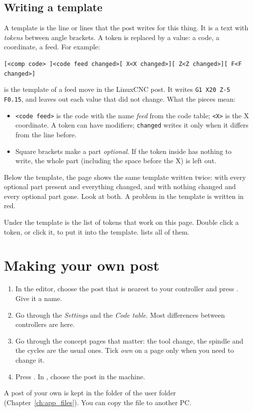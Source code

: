 \subsection{Writing a template}
A template is the line or lines that the post writes for this thing. It is a text with \emph{tokens} between angle brackets. A token is replaced by a value: a code, a coordinate, a feed. For example:
\begin{center}\texttt{[<comp code> ]<code feed changed>[ X<X changed>][ Z<Z changed>][ F<F changed>]}\end{center}
is the template of a feed move in the LinuxCNC post. It writes \texttt{G1 X20 Z-5 F0.15}, and leaves out each value that did not change. What the pieces mean:
\begin{itemize}
  \item \texttt{<code feed>} is the code with the name \emph{feed} from the code table; \texttt{<X>} is the X coordinate. A token can have modifiers; \texttt{changed} writes it only when it differs from the line before.
  \item Square brackets make a part \emph{optional}. If the token inside has nothing to write, the whole part (including the space before the X) is left out.
\end{itemize}
Below the template, the page shows the same template written twice: with every optional part present and everything changed, and with nothing changed and every optional part gone. Look at both. A problem in the template is written in red.

Under the template is the list of tokens that work on this page. Double click a token, or click it, to put it into the template.  lists all of them.

\section{Making your own post}\label{sec:posts:own}
\begin{enumerate}
  \item In the editor, choose the post that is nearest to your controller and press . Give it a name.
  \item Go through the \emph{Settings} and the \emph{Code table}. Most differences between controllers are here.
  \item Go through the concept pages that matter: the tool change, the spindle and the cycles are the usual ones. Tick \emph{own} on a page only when you need to change it.
  \item Press . In , choose the post in the machine.
\end{enumerate}
A post of your own is kept in the  folder of the user folder (Chapter~\ref{ch:app_files}). You can copy the file to another PC.

